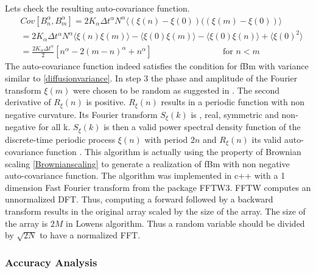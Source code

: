\documentclass[
  a4paper,BCOR10mm,oneside,
  headsepline,footsepline,%
  fleqn,openbib
]{scrbook}
\begin{document}
Lets check the resulting auto-covariance function. 
\begin{align}
  & Cov[B^{\alpha}_n,B^{\alpha}_m]= 2 K_{\alpha} \Delta t^{\alpha} N^{\alpha} \langle (\xi(n)- \xi(0)) ((\xi(m)- \xi(0))\rangle \\
 &=  2 K_{\alpha} \Delta t^{\alpha} N^{\alpha}\langle\xi(n)\xi(m)\rangle -\langle \xi(0) \xi(m)\rangle - \langle \xi(0) \xi(n)\rangle +\langle \xi(0)^2\rangle \\ 
 &=\frac{2 K_{\alpha} \Delta t^{\alpha}}{2}[n^{\alpha}-2(m-n)^{\alpha}+n^{\alpha}]\qquad \qquad \qquad \qquad  \text{ for }  n < m
\end{align}
The auto-covariance function indeed satisfies the condition for fBm with variance similar to \cref{diffusionvariance}. In step 3 the phase and amplitude of the Fourier transform  $\xi(m)$ were chosen to be random  as suggested in \cite{Timmer1995}. The second derivative of $R_{\xi}(n) $ is positive. $R_{\xi}(n) $ results in a periodic function with non negative curvature. Its Fourier transform $S_{\xi}(k)$ is , real, symmetric  and non-negative for all k. $S_{\xi}(k)$ is then a valid power spectral density function of the discrete-time periodic process $\xi(n)$ with period $2n$ and  $R_{\xi}(n)$ its valid auto-covariance function \cite{Lowen1999}. This algorithm is actually using the property of Brownian scaling \cref{Brownianscaling} to generate a realization of fBm  with non negative auto-covariance function. The algorithm was implemented in c++ with a 1 dimension Fast Fourier transform from the package FFTW3. FFTW computes an unnormalized DFT. Thus, computing a forward followed by a backward transform results in the original array scaled by the size of the array. The size of the array is $2M$  in Lowens algorithm. Thus a random variable should be divided by $\sqrt{2N}$ to have a normalized FFT.

\subsubsection{Accuracy Analysis}
\end{document}
